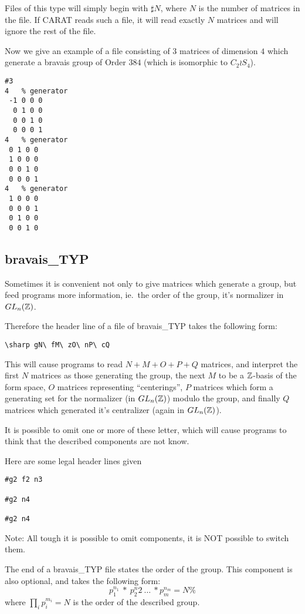 Files of this type will simply begin with $\sharp N$, where $N$ is the
number of matrices in the file. If CARAT reads such a file, it will
read exactly $N$ matrices and will ignore the rest of the file.

Now we give an example of a file consisting of $3$ matrices of dimension $4$
which generate a bravais group of Order $384$ (which is isomorphic to
$C_2 \wr S_4$).
\begin{verbatim}
#3
4	% generator
 -1 0 0 0
  0 1 0 0
  0 0 1 0
  0 0 0 1
4	% generator
 0 1 0 0
 1 0 0 0
 0 0 1 0
 0 0 0 1
4	% generator
 1 0 0 0
 0 0 0 1
 0 1 0 0
 0 0 1 0
\end{verbatim}


\subsection{\rm bravais\_TYP}

Sometimes it is convenient not only to give matrices which generate a
group, but feed programs more information, ie.\ the order of the group,
it's normalizer in $GL_n(\mathbb Z)$.

Therefore the header line of a file of {\rm bravais\_TYP} takes the
following form:
\begin{verbatim}
\sharp gN\ fM\ zO\ nP\ cQ
\end{verbatim}
This will cause programs to read $N+M+O+P+Q$ matrices, and interpret
the first $N$ matrices as those generating the group, the next $M$
to be a $\mathbb Z$-basis of the form space, $O$ matrices representing ``centerings'',
$P$ matrices which form a generating set for the normalizer (in $GL_n(\mathbb Z)$)
modulo the group, and finally $Q$ matrices which generated it's centralizer
(again in $GL_n(\mathbb Z)$).

It is possible to omit one or more of these letter, which will cause
programs to think that the described components are not know.

Here are some legal header lines given
\begin{verbatim}
#g2 f2 n3

#g2 n4

#g2 n4
\end{verbatim}
Note: All tough it is possible to omit components, it is NOT possible to switch
them.

The end of a {\rm bravais\_TYP} file states the order of the group. This
component is also optional, and takes the following form:
\begin{displaymath}
p_1^{n_1}\ \ast\ p_2^n2\ \dots\ \ast p_m^{n_m} = N\%
\end{displaymath}
where $\prod_i p_i^{m_i} = N$ is the order of the described group.

